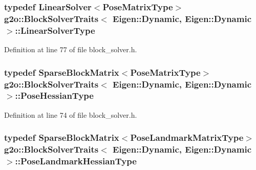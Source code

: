 \subsubsection[{\texorpdfstring{Linear\+Solver\+Type}{LinearSolverType}}]{\setlength{\rightskip}{0pt plus 5cm}typedef {\bf Linear\+Solver}$<${\bf Pose\+Matrix\+Type}$>$ {\bf g2o\+::\+Block\+Solver\+Traits}$<$ Eigen\+::\+Dynamic, Eigen\+::\+Dynamic $>$\+::{\bf Linear\+Solver\+Type}}\hypertarget{structg2o_1_1BlockSolverTraits_3_01Eigen_1_1Dynamic_00_01Eigen_1_1Dynamic_01_4_ad062ca3c21bf3a3e08d5350174d93d6d}{}\label{structg2o_1_1BlockSolverTraits_3_01Eigen_1_1Dynamic_00_01Eigen_1_1Dynamic_01_4_ad062ca3c21bf3a3e08d5350174d93d6d}


Definition at line 77 of file block\+\_\+solver.\+h.

\subsubsection[{\texorpdfstring{Pose\+Hessian\+Type}{PoseHessianType}}]{\setlength{\rightskip}{0pt plus 5cm}typedef {\bf Sparse\+Block\+Matrix}$<${\bf Pose\+Matrix\+Type}$>$ {\bf g2o\+::\+Block\+Solver\+Traits}$<$ Eigen\+::\+Dynamic, Eigen\+::\+Dynamic $>$\+::{\bf Pose\+Hessian\+Type}}\hypertarget{structg2o_1_1BlockSolverTraits_3_01Eigen_1_1Dynamic_00_01Eigen_1_1Dynamic_01_4_a380bde2a88f9b257142dd3419422e5a3}{}\label{structg2o_1_1BlockSolverTraits_3_01Eigen_1_1Dynamic_00_01Eigen_1_1Dynamic_01_4_a380bde2a88f9b257142dd3419422e5a3}


Definition at line 74 of file block\+\_\+solver.\+h.

\subsubsection[{\texorpdfstring{Pose\+Landmark\+Hessian\+Type}{PoseLandmarkHessianType}}]{\setlength{\rightskip}{0pt plus 5cm}typedef {\bf Sparse\+Block\+Matrix}$<${\bf Pose\+Landmark\+Matrix\+Type}$>$ {\bf g2o\+::\+Block\+Solver\+Traits}$<$ Eigen\+::\+Dynamic, Eigen\+::\+Dynamic $>$\+::{\bf Pose\+Landmark\+Hessian\+Type}}\hypertarget{structg2o_1_1BlockSolverTraits_3_01Eigen_1_1Dynamic_00_01Eigen_1_1Dynamic_01_4_aa6f67fd6ba29156f6d1069db0c3b5d11}{}\label{structg2o_1_1BlockSolverTraits_3_01Eigen_1_1Dynamic_00_01Eigen_1_1Dynamic_01_4_aa6f67fd6ba29156f6d1069db0c3b5d11}


